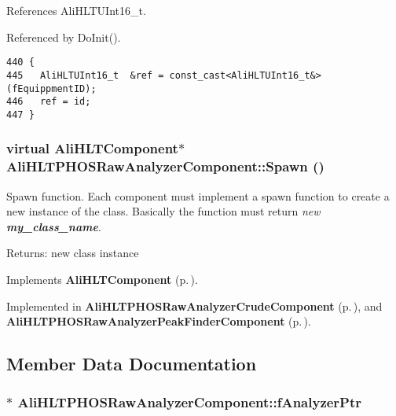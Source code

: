 References Ali\-HLTUInt16\_\-t.

Referenced by Do\-Init().

\footnotesize\begin{verbatim}440 {
445   AliHLTUInt16_t  &ref = const_cast<AliHLTUInt16_t&>(fEquippmentID); 
446   ref = id;
447 }
\end{verbatim}\normalsize 


\subsubsection{\setlength{\rightskip}{0pt plus 5cm}virtual {\bf Ali\-HLTComponent}$\ast$ Ali\-HLTPHOSRaw\-Analyzer\-Component::Spawn ()\hspace{0.3cm}{\tt  [pure virtual]}}\label{classAliHLTPHOSRawAnalyzerComponent_a16}


Spawn function. Each component must implement a spawn function to create a new instance of the class. Basically the function must return {\em new {\bf my\_\-class\_\-name}\/}. \begin{Desc}
\item[Returns:]new class instance \end{Desc}


Implements {\bf Ali\-HLTComponent} {\rm (p.\,\pageref{classAliHLTComponent_a13})}.

Implemented in {\bf Ali\-HLTPHOSRaw\-Analyzer\-Crude\-Component} {\rm (p.\,\pageref{classAliHLTPHOSRawAnalyzerCrudeComponent_a5})}, and {\bf Ali\-HLTPHOSRaw\-Analyzer\-Peak\-Finder\-Component} {\rm (p.\,\pageref{classAliHLTPHOSRawAnalyzerPeakFinderComponent_a3})}.

\subsection{Member Data Documentation}
\subsubsection{$\ast$ {\bf Ali\-HLTPHOSRaw\-Analyzer\-Component::f\-Analyzer\-Ptr}\hspace{0.3cm}{\tt  [protected]}}\label{classAliHLTPHOSRawAnalyzerComponent_p0}


